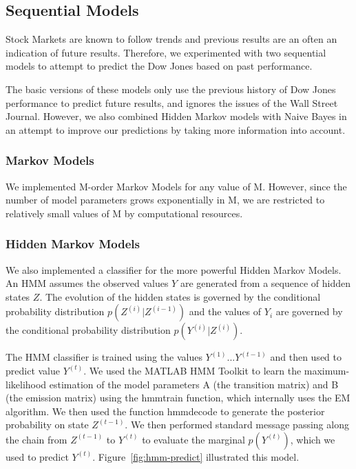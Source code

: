 \documentclass[10pt, twocolumn]{article}
\def\TODO#1{\noindent\textbf{[TODO:} #1]}
\begin{document}
\subsection{Sequential Models}
\label{sec:sequential-models}

Stock Markets are known to follow trends and previous results are an often an indication of future results.
Therefore, we experimented with two sequential models to attempt to predict the Dow Jones based on past performance.

The basic versions of these models only use the previous history of Dow Jones performance to predict future results, and ignores the issues of the Wall Street Journal.
However, we also combined Hidden Markov models with Naive Bayes in an attempt to improve our predictions by taking more information into account.

\subsubsection*{Markov Models}
\label{sec:}

We implemented M-order Markov Models for any value of M. However, since the number of model parameters grows exponentially in M, we are restricted to relatively small values of M by computational resources.

\subsubsection*{Hidden Markov Models}
\label{sec:}

We also implemented a classifier for the more powerful Hidden Markov Models. An HMM assumes the observed values $Y$ are generated from a sequence of hidden states $Z$.
The evolution of the hidden states is governed by the conditional probability distribution $p(Z^{(i)}|Z^{(i-1)})$ and the values of $Y_{i}$ are governed by the conditional probability distribution $p(Y^{(i)}|Z^{(i)})$.

The HMM classifier is trained using the values $Y^{(1)}...Y^{(t-1)}$ and then used to predict value $Y^{(t)}$.
We used the MATLAB HMM Toolkit to learn the maximum-likelihood estimation of the model parameters A (the transition matrix) and B (the emission matrix) using the hmmtrain function, which internally uses the EM algorithm.
We then used the function hmmdecode to generate the posterior probability on state $Z^{(t-1)}$.
We then performed standard message passing along the chain from $Z^{(t-1)}$ to $Y^{(t)}$ to evaluate the marginal $p(Y^{(t)})$, which we used to predict $Y^{(t)}$.
Figure~\ref{fig:hmm-predict} illustrated this model.
\end{document}
